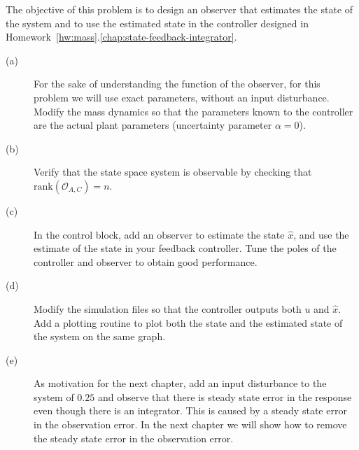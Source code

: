 The objective of this problem is to design an observer that estimates the state of the system and to use the estimated state in the controller designed in Homework~\ref{hw:mass}.\ref{chap:state-feedback-integrator}.
\begin{description}
\item[(a)] For the sake of understanding the function of the observer, for this problem we will use exact parameters, without an input disturbance.  Modify the mass dynamics so that the parameters known to the controller are the actual plant parameters (uncertainty parameter $\alpha=0$).
\item[(b)] Verify that the state space system is observable by checking that $\text{rank}(\mathcal{O}_{A,C})=n$.
\item[(c)] In the control block, add an observer to estimate the state $\hat{x}$, and use the estimate of the state in your feedback controller. Tune the poles of the controller and observer to obtain good performance.  
\item[(d)] Modify the simulation files so that the controller outputs both $u$ and $\hat{x}$.  Add a plotting routine to plot both the state and the estimated state of the system on the same graph.
\item[(e)] As motivation for the next chapter, add an input disturbance to the system of $0.25$ and observe that there is steady state error in the response even though there is an integrator.  This is caused by a steady state error in the observation error.  In the next chapter we will show how to remove the steady state error in the observation error.
\end{description}

